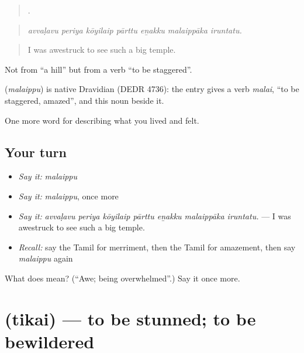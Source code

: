\begin{quote}
      .
\end{quote}

\begin{quote}
\emph{avvaḷavu periya kōyilaip pārttu eṉakku malaippāka iruntatu.}
\end{quote}

\begin{quote}
I was awestruck to see such a big temple.
\end{quote}

Not from  \textquotedblleft{}a hill\textquotedblright{} but from a verb  \textquotedblleft{}to be staggered\textquotedblright{}.

\begin{cousinweb}
\textbf{} (\emph{malaippu}) is native Dravidian (DEDR 4736): the entry gives a verb  \emph{malai}, \textquotedblleft{}to be staggered, amazed\textquotedblright{}, and this noun beside it.
\end{cousinweb}

\begin{grammarlens}[title={What you've built}]
One more word for describing what you lived and felt.
\end{grammarlens}

\subsection*{Your turn}
\begin{itemize}
\raggedright
  \item \emph{Say it:} \emph{malaippu}
  \item \emph{Say it:} \emph{malaippu}, once more
  \item \emph{Say it:} \emph{avvaḷavu periya kōyilaip pārttu eṉakku malaippāka iruntatu.} — I was awestruck to see such a big temple.
  \item \emph{Recall:} say the Tamil for merriment, then the Tamil for amazement, then say \emph{malaippu} again
\end{itemize}

\begin{tcolorbox}[breakable,colback=teal!4,colframe=teal!35!black,title={Before you move on}]
What does  mean? (\textquotedblleft{}Awe; being overwhelmed\textquotedblright{}.) Say it once more.
\end{tcolorbox}
\section[\texorpdfstring{\ta{திகை} (tikai)}{திகை (tikai)}]{ (tikai) — to be stunned; to be bewildered}

